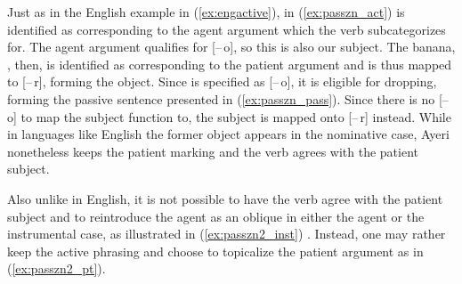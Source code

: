Just as in the English example in (\ref{ex:engactive}),  in
(\ref{ex:passzn_act}) is identified as corresponding to the agent argument
which the verb  subcategorizes for. The agent argument
qualifies for [–\,o], so this is also our subject. The banana,
, then, is identified as corresponding to the patient argument
and is thus mapped to [–\,r], forming the object. Since  is
specified as [–\,o], it is eligible for dropping, forming the passive sentence
presented in (\ref{ex:passzn_pass}). Since there is no [–\,o] to map the
subject function to, the subject is mapped onto [–\,r] instead. While in
languages like English the former object appears in the nominative case, Ayeri
nonetheless keeps the patient marking and the verb agrees with the patient
subject.

Also unlike in English, it is not possible to have the verb agree with the
patient subject and to reintroduce the agent as an oblique in either the agent
or the instrumental case, as illustrated in (\ref{ex:passzn2_inst}) \parencite
[for English, compare][416]{needhamtoivonen2011}. Instead, one may rather keep
the active phrasing and choose to topicalize the patient argument as
in (\ref{ex:passzn2_pt}).

